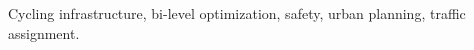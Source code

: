 \documentclass[letterpaper, 10 pt, conference]{ieeeconf}  %
\begin{document}
\begin{keywords}
Cycling infrastructure, bi-level optimization, safety,  urban planning, traffic assignment.
\end{keywords}








\end{document}
